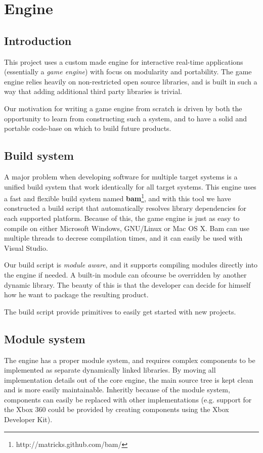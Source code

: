 
\chapter{Engine}
\section {Introduction}
This project uses a custom made engine for interactive real-time applications (essentially a \textit{game engine}) with focus on modularity and portability. The game engine relies heavily on non-restricted open source libraries, and is built in such a way that adding additional third party libraries is trivial.

Our motivation for writing a game engine from scratch is driven by both the opportunity to learn from
constructing such a system, and to have a solid and portable code-base on which to build future products.

\section {Build system}
A major problem when developing software for multiple target systems is a unified build system that work
identically for all target systems. This engine uses a fast and flexible build system named \textbf{bam}\footnote{http://matricks.github.com/bam/}, and
with this tool we have constructed a build script that automatically resolves library dependencies for each supported platform. Because of this, the game engine is just as easy to compile on either Microsoft Windows, GNU/Linux or Mac OS X. Bam can use multiple threads to decrese compilation times, and it can easily be used with Visual Studio.

Our build script is \textit{module aware}, and it supports compiling modules directly into the engine if needed. A built-in module can ofcourse be overridden by another dynamic library. The beauty of this is that the developer can decide for himself how he want to package the resulting product.

The build script provide primitives to easily get started with new projects. 

\newpage

\section{Module system}
The engine has a proper module system, and requires complex components to be implemented as separate dynamically linked libraries. By moving all implementation details out of the core engine, the main source tree is kept clean and is more easily maintainable. Inheritly because of the module system, components can easily be replaced with other implementations (e.g. support for the Xbox 360 could be provided
by creating components using the Xbox Developer Kit).

